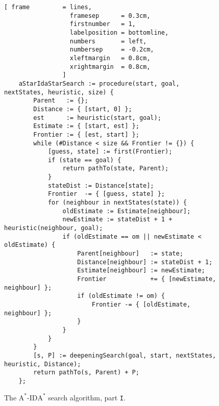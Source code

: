 \begin{figure}[!ht]
\centering
\begin{Verbatim}[ frame         = lines, 
                  framesep      = 0.3cm, 
                  firstnumber   = 1,
                  labelposition = bottomline,
                  numbers       = left,
                  numbersep     = -0.2cm,
                  xleftmargin   = 0.8cm,
                  xrightmargin  = 0.8cm,
                ]
    aStarIdaStarSearch := procedure(start, goal, nextStates, heuristic, size) {
        Parent   := {};
        Distance := { [start, 0] };
        est      := heuristic(start, goal);
        Estimate := { [start, est] };  
        Frontier := { [est, start] };
        while (#Distance < size && Frontier != {}) {
            [guess, state] := first(Frontier);
            if (state == goal) {
                return pathTo(state, Parent);
            }
            stateDist := Distance[state];
            Frontier  -= { [guess, state] };
            for (neighbour in nextStates(state)) {
                oldEstimate := Estimate[neighbour];
                newEstimate := stateDist + 1 + heuristic(neighbour, goal);
                if (oldEstimate == om || newEstimate < oldEstimate) {
                    Parent[neighbour]   := state;
                    Distance[neighbour] := stateDist + 1;
                    Estimate[neighbour] := newEstimate;
                    Frontier            += { [newEstimate, neighbour] };
                    if (oldEstimate != om) {
                        Frontier -= { [oldEstimate, neighbour] };
                    }
                }
            }
        }
        [s, P] := deepeningSearch(goal, start, nextStates, heuristic, Distance);
        return pathTo(s, Parent) + P;
    };
\end{Verbatim}
\vspace*{-0.3cm}
\caption{The $\mathrm{A}^*$-$\mathrm{IDA}^*$ search algorithm, part \texttt{I}.}
\label{fig:a-star-ida-star.stlx-1}
\end{figure}

